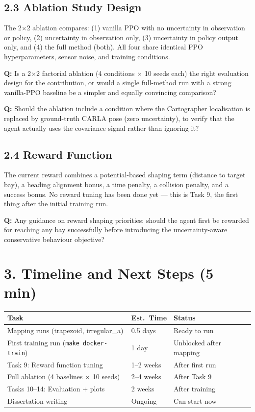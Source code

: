 \documentclass[11pt,a4paper]{article}
\newcommand{\question}[1]{\textcolor{question}{\textbf{Q:}} #1}
\begin{document}
\bigskip
\subsection*{2.3 Ablation Study Design}

The 2$\times$2 ablation compares: (1) vanilla PPO with no uncertainty in observation
or policy, (2) uncertainty in observation only, (3) uncertainty in policy output
only, and (4) the full method (both). All four share identical PPO hyperparameters,
sensor noise, and training conditions.

\question{Is a 2$\times$2 factorial ablation (4 conditions $\times$ 10 seeds each)
the right evaluation design for the contribution, or would a single full-method run
with a strong vanilla-PPO baseline be a simpler and equally convincing comparison?}

\question{Should the ablation include a condition where the Cartographer localisation
is replaced by ground-truth CARLA pose (zero uncertainty), to verify that the agent
actually uses the covariance signal rather than ignoring it?}

\bigskip
\subsection*{2.4 Reward Function}

The current reward combines a potential-based shaping term (distance to target bay),
a heading alignment bonus, a time penalty, a collision penalty, and a success bonus.
No reward tuning has been done yet --- this is Task 9, the first thing after the
initial training run.

\question{Any guidance on reward shaping priorities: should the agent first be
rewarded for reaching any bay successfully before introducing the uncertainty-aware
conservative behaviour objective?}

\section*{3. Timeline and Next Steps (5 min)}

\begin{table}[h]
\centering
\small
\begin{tabular}{@{}lll@{}}
\toprule
\textbf{Task} & \textbf{Est.\ Time} & \textbf{Status} \\
\midrule
Mapping runs (trapezoid, irregular\_a) & 0.5 days & Ready to run \\
First training run (\texttt{make docker-train}) & 1 day & Unblocked after mapping \\
Task 9: Reward function tuning & 1--2 weeks & After first run \\
Full ablation (4 baselines $\times$ 10 seeds) & 2--4 weeks & After Task 9 \\
Tasks 10--14: Evaluation + plots & 2 weeks & After training \\
Dissertation writing & Ongoing & Can start now \\
\bottomrule
\end{tabular}
\end{table}
\end{document}
